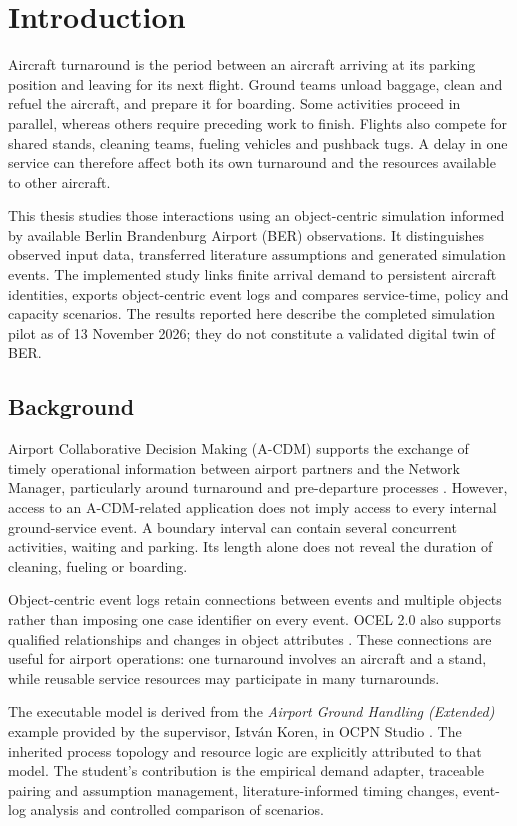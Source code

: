\chapter{Introduction}
\label{ch:intro}

Aircraft turnaround is the period between an aircraft arriving at its parking position and leaving for its next flight. Ground teams unload baggage, clean and refuel the aircraft, and prepare it for boarding. Some activities proceed in parallel, whereas others require preceding work to finish. Flights also compete for shared stands, cleaning teams, fueling vehicles and pushback tugs. A delay in one service can therefore affect both its own turnaround and the resources available to other aircraft.

This thesis studies those interactions using an object-centric simulation informed by available Berlin Brandenburg Airport (BER) observations. It distinguishes observed input data, transferred literature assumptions and generated simulation events. The implemented study links finite arrival demand to persistent aircraft identities, exports object-centric event logs and compares service-time, policy and capacity scenarios. The results reported here describe the completed simulation pilot as of 13 November 2026; they do not constitute a validated digital twin of BER.

\section{Background}
Airport Collaborative Decision Making (A-CDM) supports the exchange of timely operational information between airport partners and the Network Manager, particularly around turnaround and pre-departure processes \cite{eurocontrol_acdm}. However, access to an A-CDM-related application does not imply access to every internal ground-service event. A boundary interval can contain several concurrent activities, waiting and parking. Its length alone does not reveal the duration of cleaning, fueling or boarding.

Object-centric event logs retain connections between events and multiple objects rather than imposing one case identifier on every event. OCEL 2.0 also supports qualified relationships and changes in object attributes \cite{ocel2}. These connections are useful for airport operations: one turnaround involves an aircraft and a stand, while reusable service resources may participate in many turnarounds.

The executable model is derived from the \emph{Airport Ground Handling (Extended)} example provided by the supervisor, Istv\'an Koren, in OCPN Studio \cite{ocpn_studio}. The inherited process topology and resource logic are explicitly attributed to that model. The student's contribution is the empirical demand adapter, traceable pairing and assumption management, literature-informed timing changes, event-log analysis and controlled comparison of scenarios.

